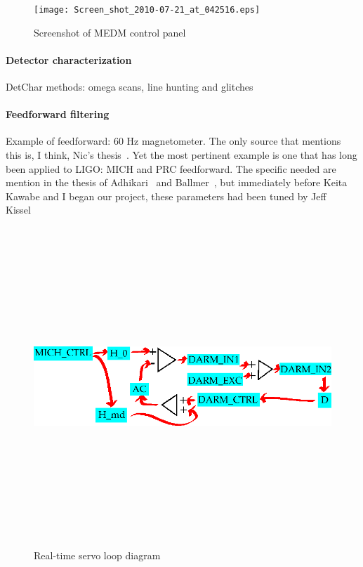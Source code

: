 	\begin{figure}
	\begin{center}
	\texttt{[image: Screen\_shot\_2010-07-21\_at\_042516.eps]}
	\caption{Screenshot of MEDM control panel}
	\label{ScreenshotMEDM}
	\end{center}
	\end{figure}


                \paragraph{Detector characterization}
                \label{detchar}
            
                    DetChar methods: omega scans, line hunting and glitches

                \paragraph{Feedforward filtering}
                \label{feedforward_filters}

                    Example of feedforward: 60 Hz magnetometer. The only source that mentions this is, I think, Nic's thesis~\cite{SmithThesis}. Yet the most pertinent example is one that has long been applied to LIGO: MICH and PRC feedforward. The specific needed are mention in the thesis of Adhikari~\cite{AdhikariThesis} and Ballmer~\cite{BallmerThesis}, but immediately before Keita Kawabe and I began our project, these parameters had been tuned by Jeff Kissel~\cite{KissellPRCMICH}

	\begin{figure}
	\begin{center}
	\includegraphics[height=120mm, width=160mm]{servo_loop.eps}
	\caption{Real-time servo loop diagram}
	\label{servo_loop_realtime}
	\end{center}
	\end{figure}

